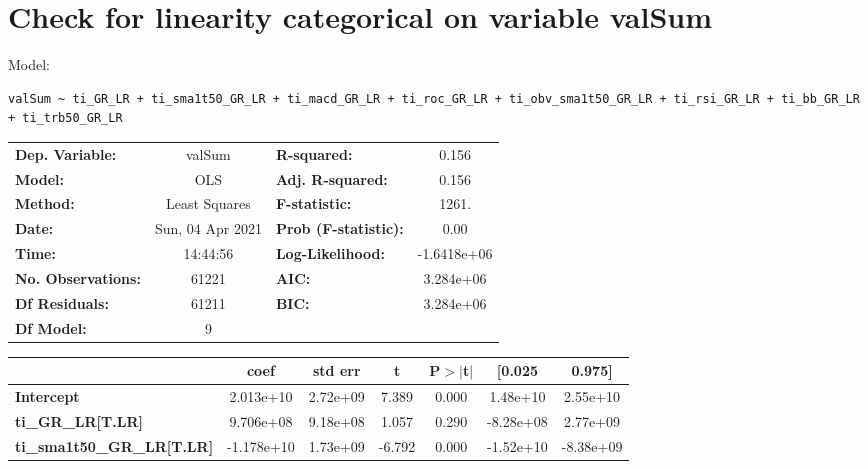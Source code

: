 \section{Check for linearity categorical on variable valSum}

Model: \begin{verbatim}valSum ~ ti_GR_LR + ti_sma1t50_GR_LR + ti_macd_GR_LR + ti_roc_GR_LR + ti_obv_sma1t50_GR_LR + ti_rsi_GR_LR + ti_bb_GR_LR + ti_trb50_GR_LR\end{verbatim}

\begin{center}
\begin{tabular}{lclc}
\toprule
\textbf{Dep. Variable:}                 &      valSum      & \textbf{  R-squared:         } &      0.156   \\
\textbf{Model:}                         &       OLS        & \textbf{  Adj. R-squared:    } &      0.156   \\
\textbf{Method:}                        &  Least Squares   & \textbf{  F-statistic:       } &      1261.   \\
\textbf{Date:}                          & Sun, 04 Apr 2021 & \textbf{  Prob (F-statistic):} &      0.00    \\
\textbf{Time:}                          &     14:44:56     & \textbf{  Log-Likelihood:    } & -1.6418e+06  \\
\textbf{No. Observations:}              &       61221      & \textbf{  AIC:               } &  3.284e+06   \\
\textbf{Df Residuals:}                  &       61211      & \textbf{  BIC:               } &  3.284e+06   \\
\textbf{Df Model:}                      &           9      & \textbf{                     } &              \\
\bottomrule
\end{tabular}
\begin{tabular}{lcccccc}
                                        & \textbf{coef} & \textbf{std err} & \textbf{t} & \textbf{P$> |$t$|$} & \textbf{[0.025} & \textbf{0.975]}  \\
\midrule
\textbf{Intercept}                      &    2.013e+10  &     2.72e+09     &     7.389  &         0.000        &     1.48e+10    &     2.55e+10     \\
\textbf{ti\_GR\_LR[T.LR]}               &    9.706e+08  &     9.18e+08     &     1.057  &         0.290        &    -8.28e+08    &     2.77e+09     \\
\textbf{ti\_sma1t50\_GR\_LR[T.LR]}      &   -1.178e+10  &     1.73e+09     &    -6.792  &         0.000        &    -1.52e+10    &    -8.38e+09     \\

\end{tabular}
\end{center}
